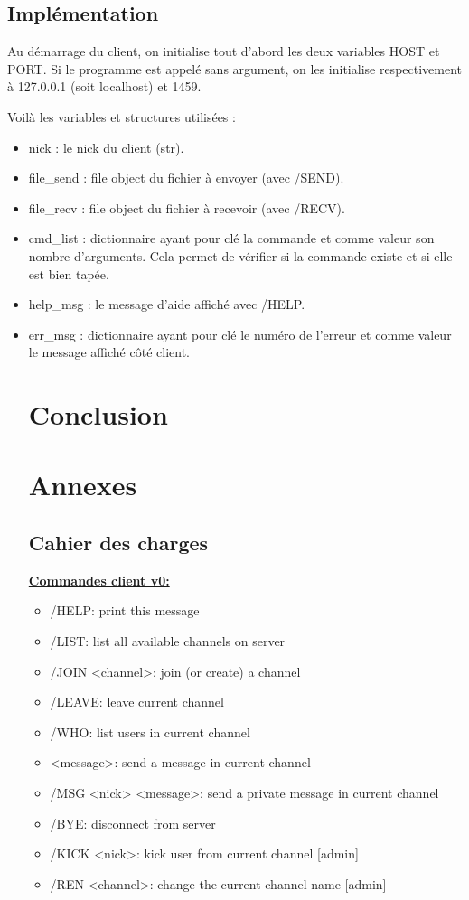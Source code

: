 \documentclass[12pt]{article}
\begin{document}
{\subsection{Implémentation}
Au démarrage du client, on initialise tout d'abord les deux variables HOST et PORT.
Si le programme est appelé sans argument, on les initialise respectivement à 127.0.0.1 (soit localhost) et 1459.

Voilà les variables et structures utilisées :
\begin{itemize}
    \item nick : le nick du client (str).
    \item file_send : file object du fichier à envoyer (avec /SEND).
    \item file_recv : file object du fichier à recevoir (avec /RECV).
    \item cmd_list : dictionnaire ayant pour clé la commande et comme valeur son nombre d'arguments. Cela permet de vérifier si la commande existe et si elle est bien tapée.
    \item help_msg : le message d'aide affiché avec /HELP.
    \item err_msg : dictionnaire ayant pour clé le numéro de l'erreur et comme valeur le message affiché côté client.



\section{Conclusion}




\section{Annexes}
\subsection{Cahier des charges}
{\large \textbf{\underline{Commandes client v0:}}}
\begin{itemize}
    \item /HELP: print this message
    \item /LIST: list all available channels on server
    \item /JOIN <channel>: join (or create) a channel
    \item /LEAVE: leave current channel
    \item /WHO: list users in current channel
    \item <message>: send a message in current channel
    \item /MSG <nick> <message>: send a private message in current channel
    \item /BYE: disconnect from server
    \item /KICK <nick>: kick user from current channel [admin]
    \item /REN <channel>: change the current channel name [admin]
\end{itemize}


\end{itemize}}
\end{document}
